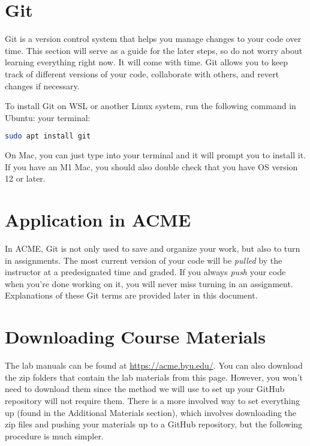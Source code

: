 \ifbootcamp
\section*{Git}

Git is a version control system that helps you manage changes to your code over time. 
This section will serve as a guide for the later steps, so do not worry about learning everything right now. 
It will come with time.
Git allows you to keep track of different versions of your code, collaborate with others, and revert changes if necessary.

To install Git on WSL or another Linux system, run the following command in 
\ifwindows
Ubuntu:
\else
your terminal:
\fi
\begin{lstlisting}[language=bash]
sudo apt install git
\end{lstlisting}
\ifwindows

\else
On Mac, you can just type  into your terminal and it will prompt you to install it.
If you have an M1 Mac, you should also double check that you have OS version 12 or later.
\fi

\section*{Application in ACME}

In ACME, Git is not only used to save and organize your work, but also to turn in assignments.
The most current version of your code will be \emph{pulled} by the instructor at a predesignated time and graded.
If you always \emph{push} your code when you're done working on it, you will never miss turning in an assignment.
Explanations of these Git terms are provided later in this document.
\fi


\ifbyu  %
\section*{Downloading Course Materials}

The lab manuals can be found at 
\url{https://acme.byu.edu/}.
You can also download the zip folders that contain the lab materials from this page.
\ifbootcamp
However, you won't need to download them since the method we will use to set up your GitHub repository will not require them.
There is a more involved way to set everything up (found in the Additional Materials section), which involves downloading the zip files and pushing your materials up to a GitHub repository, but the following procedure is much simpler.
\fi

